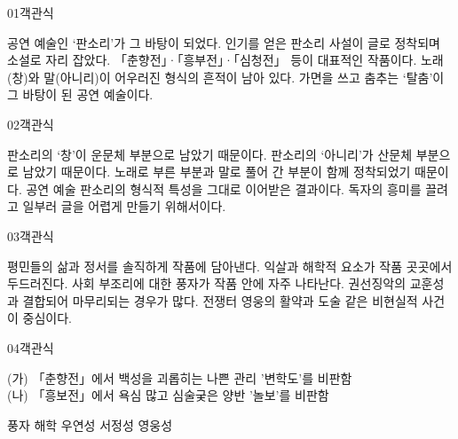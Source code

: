 \documentclass[fs9,seriesRus]{korfarm-base}
\begin{document}
\par\medskip
\kfBeginMC
\begin{kfQBlock}{01}{객관식}
\begin{kfChoices}
\kfChoice 공연 예술인 ‘판소리’가 그 바탕이 되었다.
\kfChoice 인기를 얻은 판소리 사설이 글로 정착되며 소설로 자리 잡았다.
\kfChoice 「춘향전」·「흥부전」·「심청전」 등이 대표적인 작품이다.
\kfChoice 노래(창)와 말(아니리)이 어우러진 형식의 흔적이 남아 있다.
\kfChoice 가면을 쓰고 춤추는 ‘탈춤’이 그 바탕이 된 공연 예술이다.
\end{kfChoices}
\end{kfQBlock}
\begin{kfQBlock}{02}{객관식}
\begin{kfChoices}
\kfChoice 판소리의 ‘창’이 운문체 부분으로 남았기 때문이다.
\kfChoice 판소리의 ‘아니리’가 산문체 부분으로 남았기 때문이다.
\kfChoice 노래로 부른 부분과 말로 풀어 간 부분이 함께 정착되었기 때문이다.
\kfChoice 공연 예술 판소리의 형식적 특성을 그대로 이어받은 결과이다.
\kfChoice 독자의 흥미를 끌려고 일부러 글을 어렵게 만들기 위해서이다.
\end{kfChoices}
\end{kfQBlock}
\begin{kfQBlock}{03}{객관식}
\begin{kfChoices}
\kfChoice 평민들의 삶과 정서를 솔직하게 작품에 담아낸다.
\kfChoice 익살과 해학적 요소가 작품 곳곳에서 두드러진다.
\kfChoice 사회 부조리에 대한 풍자가 작품 안에 자주 나타난다.
\kfChoice 권선징악의 교훈성과 결합되어 마무리되는 경우가 많다.
\kfChoice 전쟁터 영웅의 활약과 도술 같은 비현실적 사건이 중심이다.
\end{kfChoices}
\end{kfQBlock}
\begin{kfQBlock}{04}{객관식}
\begin{kfEvidence}(가) 「춘향전」에서 백성을 괴롭히는 나쁜 관리 '변학도'를 비판함   \\\relax
   (나) 「흥보전」에서 욕심 많고 심술궂은 양반 '놀보'를 비판함\end{kfEvidence}
\begin{kfChoices}
\kfChoice 풍자
\kfChoice 해학
\kfChoice 우연성
\kfChoice 서정성
\kfChoice 영웅성
\end{kfChoices}
\end{kfQBlock}
\end{document}
